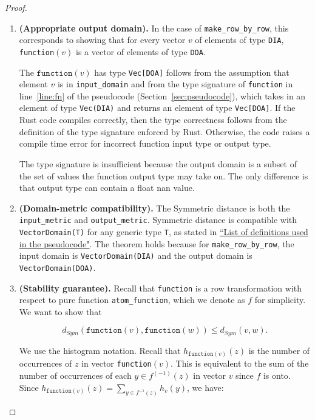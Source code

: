 \documentclass[11pt,a4paper]{article}
\newcommand{\grace}[1]{{ {\color{purple}{(grace)~#1}}}}
\newcommand{\function}{\texttt{function}}
\begin{document}
\begin{proof}
\begin{enumerate}
\item \textbf{(Appropriate output domain).} In the case of \texttt{make\_row\_by\_row}, this corresponds to showing that for every vector $v$ of elements of type \texttt{DIA}, \texttt{function}$(v)$ is a vector of elements of type \texttt{DOA}. 

The $\function(v)$ has type \texttt{Vec[DOA]} follows from the assumption that element $v$ is in \texttt{input\_domain} and from the type signature of \texttt{function} in line~\ref{line:fn} of the pseudocode (Section~\ref{sec:pseudocode}), which takes in an element of type \texttt{Vec(DIA)} and returns an element of type \texttt{Vec[DOA]}. If the Rust code compiles correctly, then the type correctness follows from the definition of the type signature enforced by Rust. Otherwise, the code raises a compile time error for incorrect function input type or output type. 

The type signature is insufficient because the output domain is a subset of the set of values the function output type may take on. The only difference is that output type can contain a float nan value. \grace{TODO finish typing this later}


\item \textbf{(Domain-metric compatibility).} The Symmetric distance is both the \texttt{input\_metric} and \texttt{output\_metric}. Symmetric distance is compatible with \texttt{VectorDomain(T)} for any generic type \texttt{T}, as stated in \href{https://www.overleaf.com/project/60d215bf90b337ac02200a99}{``List of definitions used in the pseudocode"}. The theorem holds because for \texttt{make\_row\_by\_row}, the input domain is \texttt{VectorDomain(DIA)} and the output domain is \texttt{VectorDomain(DOA)}. 


\item \textbf{(Stability guarantee).} 
Recall that \texttt{function} is a row transformation with respect to pure function \texttt{atom\_function}, which we denote as $f$ for simplicity. We want to show that

$$d_{Sym}(\texttt{function}(v), \texttt{function}(w)) \leq d_{Sym}(v, w).$$

We use the histogram notation. Recall that $h_{\texttt{function}(v)}(z)$ is the number of occurrences of $z$ in vector \texttt{function}$(v)$. This is equivalent to the sum of the number of occurrences of each $y \in f^{(-1)}(z)$ in vector $v$ since $f$ is onto. \grace{I think $f$ must be onto for this to work -- does this come from the fact that $f$ is a pure function?} Since $h_{\texttt{function}(v)}(z) = \sum_{y \in f^{-1}(z)} h_v(y)$, we have:


\end{enumerate}
\end{proof}
\end{document}

